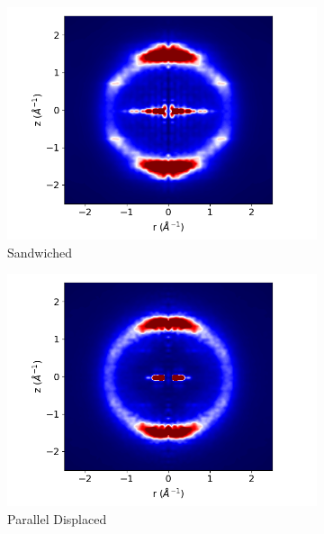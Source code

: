 \documentclass{article}
\begin{document}
\begin{figure}
        \begin{subfigure}{0.475\textwidth}
                \centering
                \includegraphics[width=\textwidth]{layered_rzplot.png}
                \caption{Sandwiched}\label{fig:xrd_layered}
        \end{subfigure}
        \begin{subfigure}{0.475\textwidth}
                \centering
                \includegraphics[width=\textwidth]{offset_rzplot.png}
                \caption{Parallel Displaced}\label{fig:xrd_offset}
        \end{subfigure}
	\caption{}\label{fig:xrd_280}
\end{figure}
\end{document}
